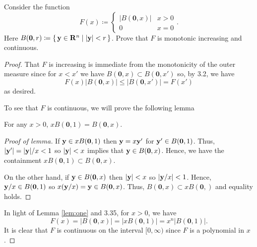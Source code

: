 \begin{problem}
Consider the function
\[
F(x)\coloneqq
\begin{cases}
|B(\mathbf{0},x)|&x>0\\
0&x=0
\end{cases}.
\]
Here
$B(\mathbf{0},r)\coloneqq\left\{\,\mathbf{y}\in\mathbf{R}^n\;\middle|\;|\mathbf{y}|<r\,\right\}$. Prove
that $F$ is monotonic increasing and continuous.
\end{problem}
\begin{proof}
That $F$ is increasing is immediate from the monotonicity of the outer
measure since for $x<x'$ we have $B(\mathbf{0},x)\subset B(\mathbf{0},x')$
so, by 3.2, we have
\[
F(x)\left|B(\mathbf{0},x)\right|\leq\left|B(\mathbf{0},x')\right|=F(x')
\]
as desired.

To see that $F$ is continuous, we will prove the following lemma
\begin{lemma}
\label{lem:one}
For any $x>0$, $xB(\mathbf{0},1)=B(\mathbf{0},x)$.
\end{lemma}
\begin{proof}[Proof of lemma]
\renewcommand\qedsymbol{$\clubsuit$}
If $\mathbf{y}\in xB(\mathbf{0},1)$ then $\mathbf{y}=x\mathbf{y}'$ for $\mathbf{y}'\in
B(\mathbf{0},1)$. Thus, $|\mathbf{y}'|=|\mathbf{y}|/x<1$ so $|\mathbf{y}|<x$ implies that
$\mathbf{y}\in B(\mathbf{0},x)$. Hence, we have the containment
$xB(\mathbf{0},1)\subset B(\mathbf{0},x)$.

On the other hand, if $\mathbf{y}\in B(\mathbf{0},x)$ then $|\mathbf{y}|<x$ so
$\left|\mathbf{y}/x\right|<1$. Hence, $\mathbf{y}/x\in B(\mathbf{0},1)$ so
$x(\mathbf{y}/x)=\mathbf{y}\in B(\mathbf{0},x)$. Thus, $B(\mathbf{0},x)\subset
xB(\mathbf{0},)$ and equality holds.
\end{proof}
In light of Lemma \ref{lem:one} and 3.35, for $x>0$, we have
\begin{equation}
\label{eq:scale-map}
F(x)=\left|B(\mathbf{0},x)\right|
=\left|xB(\mathbf{0},1)\right|
=x^n\left|B(\mathbf{0},1)\right|.
\end{equation}
It is clear that $F$ is continuous on the interval $[0,\infty)$ since $F$
is a polynomial in $x$.
\end{proof}

